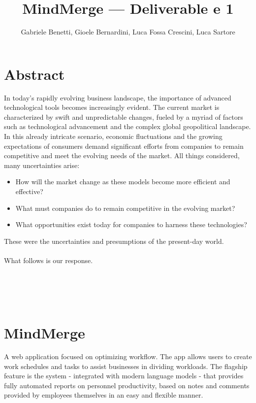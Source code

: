 \documentclass{article}
\title{MindMerge --- Deliverable e 1}
\author{Gabriele Benetti, Gioele Bernardini, Luca Fossa Crescini, Luca Sartore}
\begin{document}
\maketitle


\tableofcontents


\newpage
{}
\section*{Abstract}   %
In today's rapidly evolving business landscape, the importance of advanced technological tools becomes increasingly evident. 
The current market is characterized by swift and unpredictable changes, fueled by a myriad of factors such as technological advancement and the complex global geopolitical landscape. 
In this already intricate scenario, economic fluctuations and the growing expectations of consumers 
demand significant efforts from companies to remain competitive 
and meet the evolving needs of the market. All things considered, many uncertainties arise:

\begin{itemize}
    \item How will the market change as these models become more efficient and effective?
    \item What must companies do to remain competitive in the evolving market?
    \item What opportunities exist today for companies to harness these technologies?
\end{itemize}
These were the uncertainties and presumptions of the present-day world.\\
\\
What follows is our response.
\\
\\
\\
\\
\\

\section*{MindMerge}
A web application focused on optimizing workflow. 
The app allows users to create work schedules and tasks to assist businesses in dividing workloads. 
The flagship feature is the system - integrated with modern language models - that provides fully automated reports on personnel productivity, based on notes and comments provided by employees themselves in an easy and flexible manner.
\pagebreak
\restoregeometry
\end{document}
